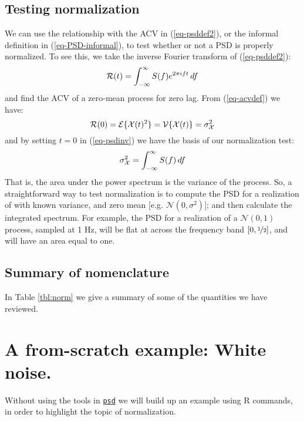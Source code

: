 \documentclass[11pt]{article}\usepackage{graphicx, color}
\newcommand{\Rcmd}[1]{\texttt{#1}}
\newcommand{\psd}[0]{\href{http://abarbour.github.com/psd/}{\color{blue}\Rcmd{psd}}}
\newcommand{\idx}[1]{\index{#1}{#1}}
\begin{document}
\subsection{Testing normalization}
We can use the relationship with the ACV in (\ref{eq-psddef2}), or
the informal definition in (\ref{eq-PSD-informal}),
to test whether or not a PSD is properly normalized.  
To see this, we take the
inverse Fourier transform of (\ref{eq-psddef2}):
%
\begin{equation}
\label{eq-psdinv}
\mathcal{R}(t) = \int_{- \infty} ^{\infty} S(f){} e ^ {2 \pi i ft} \, df
\end{equation}
%
and find the ACV of a zero-mean 
process for zero lag.  From (\ref{eq-acvdef}) we have:
%
\begin{equation}
\label{eq-acvprop}
\mathcal{R}(0) = \mathcal{E} \{ \mathcal{X}(t){}^2 \} = \mathcal{V} \{ \mathcal{X}(t){} \} = \sigma_\mathcal{X} ^ 2
\end{equation}
%
and by setting $t = 0$ in
(\ref{eq-psdinv}) we have the basis of our normalization test:
%
\begin{equation}
\label{eq-psdnorm}
\sigma_\mathcal{X} ^ 2 = \int_{- \infty} ^{\infty} S (f) \, df
\end{equation}
%
That is,
the area under the power spectrum is the variance
of the process.
So, a straightforward way to test normalization 
is to compute the PSD for a realization of \dXstoch{} with
known variance, and zero mean [e.g. $\mathcal{N}(0,\sigma^2)$]; and then
calculate the integrated spectrum.
For example, the \idx{single-sided}
PSD for a realization of a $\mathcal{N}(0, 1)$ process, 
sampled at 1 Hz, 
will be flat at 
across the frequency band $[0, \half]$,
and will have
an area equal to one.

\subsection{Summary of nomenclature}

In Table \ref{tbl:norm} we give a summary of some
of the quantities we have reviewed.



\section{A from-scratch example: White noise.}
Without using the tools in \psd{} we will build up an example
using R commands, in order to highlight the topic of normalization.
\end{document}
